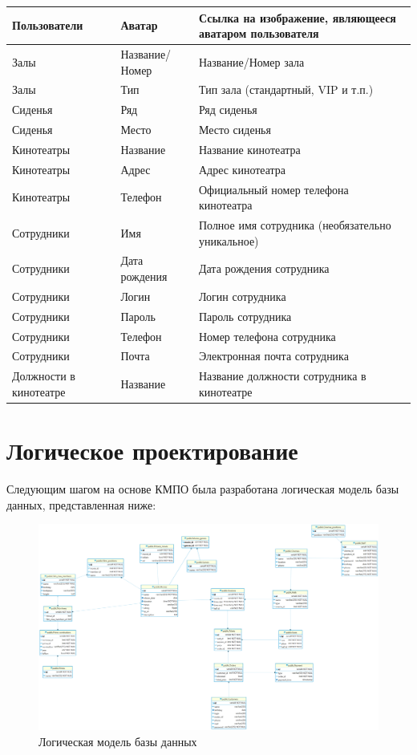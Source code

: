 \documentclass[a4paper,12pt]{article}
\renewcommand{\^}[2]{#1^{\, #2} \kern -1pt}
\newcommand{\1}{\kern 1pt}
\newcommand{\0}{\kern -1pt}
\begin{document}
	\begin{center}
		\begin{tabular}{|p{4cm}|p{4cm}|p{7cm}|}
			\hline
			Пользователи	& Аватар	& Ссылка на изображение, являющееся аватаром пользователя	\\ \hline
			Залы	& Название/Номер	& Название/Номер зала	\\ \hline
			Залы	& Тип	& Тип зала (стандартный, VIP и т.п.)	\\ \hline
			Сиденья	& Ряд	& Ряд сиденья	\\ \hline
			Сиденья	& Место	& Место сиденья	\\ \hline
			Кинотеатры	& Название	& Название кинотеатра	\\ \hline
			Кинотеатры	& Адрес	& Адрес кинотеатра	\\ \hline
			Кинотеатры	& Телефон	& Официальный номер телефона кинотеатра	\\ \hline
			Сотрудники	& Имя	& Полное имя сотрудника (необязательно уникальное)	\\ \hline
			Сотрудники	& Дата рождения	& Дата рождения сотрудника	\\ \hline
			Сотрудники	& Логин	& Логин сотрудника	\\ \hline
			Сотрудники	& Пароль	& Пароль сотрудника	\\ \hline
			Сотрудники	& Телефон	& Номер телефона сотрудника	\\ \hline
			Сотрудники	& Почта	& Электронная почта сотрудника	\\ \hline
			Должности в кинотеатре	& Название	& Название должности сотрудника в кинотеатре	\\ \hline
		\end{tabular}
	\end{center}
	
	\newpage
	
	\section{Логическое проектирование}
	
	Следующим шагом на основе КМПО была разработана логическая модель базы данных, представленная ниже:
	
	\begin{figure}[h]
		\hspace{-1.75cm}
		\includegraphics[scale=0.19,page=1]{Логическая модель.png}
		\caption{Логическая модель базы данных}
	\end{figure}
\end{document}

